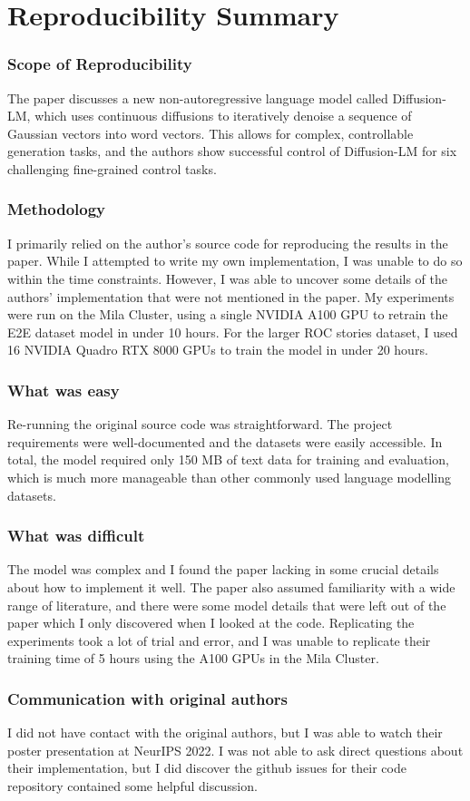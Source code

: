 \section*{\centering Reproducibility Summary}

\subsubsection*{Scope of Reproducibility}
The paper discusses a new non-autoregressive language model called Diffusion-LM, which uses continuous diffusions to iteratively denoise a sequence of Gaussian vectors into word vectors. This allows for complex, controllable generation tasks, and the authors show successful control of Diffusion-LM for six challenging fine-grained control tasks.

\subsubsection*{Methodology}
I primarily relied on the author's source code for reproducing the results in the paper. While I attempted to write my own implementation, I was unable to do so within the time constraints. However, I was able to uncover some details of the authors' implementation that were not mentioned in the paper. My experiments were run on the Mila Cluster, using a single NVIDIA A100 GPU to retrain the E2E dataset model in under 10 hours. For the larger ROC stories dataset, I used 16 NVIDIA Quadro RTX 8000 GPUs to train the model in under 20 hours.

\subsubsection*{What was easy}
Re-running the original source code was straightforward. The project requirements were well-documented and the datasets were easily accessible. In total, the model required only 150 MB of text data for training and evaluation, which is much more manageable than other commonly used language modelling datasets.

\subsubsection*{What was difficult}
The model was complex and I found the paper lacking in some crucial details about how to implement it well. The paper also assumed familiarity with a wide range of literature, and there were some model details that were left out of the paper which I only discovered when I looked at the code. Replicating the experiments took a lot of trial and error, and I was unable to replicate their training time of 5 hours using the A100 GPUs in the Mila Cluster.

\subsubsection*{Communication with original authors}
I did not have contact with the original authors, but I was able to watch their poster presentation at NeurIPS 2022. I was not able to ask direct questions about their implementation, but I did discover the github issues for their code repository contained some helpful discussion.
